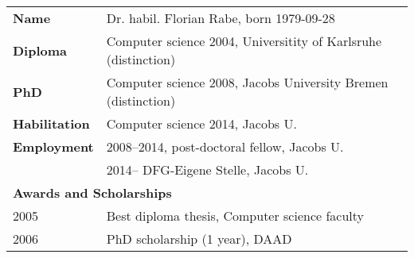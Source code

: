 \newcommand{\tb}{\hspace*{1cm}}

\begin{tabularx}{\textwidth}{lX}
\textbf{Name}           & Dr. habil. Florian Rabe, born 1979-09-28 \\
\textbf{Diploma}        & Computer science 2004, Universitity of Karlsruhe (distinction) \\
\textbf{PhD}            & Computer science 2008, Jacobs University Bremen (distinction) \\
\textbf{Habilitation}   & Computer science 2014, Jacobs U. \\
\textbf{Employment}     & 2008--2014, post-doctoral fellow, Jacobs U. \\
                        & 2014-- DFG-Eigene Stelle, Jacobs U.\\
\multicolumn{2}{l}{\textbf{Awards and Scholarships}}  \\
\tb  2005               & Best diploma thesis, Computer science faculty \\
\tb  2006               & PhD scholarship (1 year), DAAD\\

\end{tabularx}
